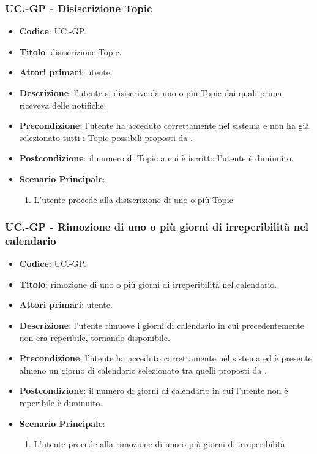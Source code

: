 	\subsubsection{UC\theuccount.\thesubuccount-GP - Disiscrizione Topic}
		
		\begin{itemize}
			\item \textbf{Codice}: UC\theuccount.\thesubuccount-GP.
			\item \textbf{Titolo}: disiscrizione Topic.
			\item \textbf{Attori primari}: utente.
			\item \textbf{Descrizione}: l’utente si disiscrive da uno o più Topic dai quali prima riceveva delle notifiche.
			\item \textbf{Precondizione}: l’utente ha acceduto correttamente nel sistema e non ha già selezionato tutti i Topic possibili proposti da \progetto.
			\item \textbf{Postcondizione}: il numero di Topic a cui è iscritto l’utente è diminuito.
			\item \textbf{Scenario Principale}:
			\begin{enumerate}
				\item L'utente procede alla disiscrizione di uno o più Topic
			\end{enumerate}
		\end{itemize}
	
	\subsubsection{UC\theuccount.\thesubuccount-GP - Rimozione di uno o più giorni di irreperibilità nel calendario}
	
	\begin{itemize}
		\item \textbf{Codice}: UC\theuccount.\thesubuccount-GP.
		\item \textbf{Titolo}: rimozione di uno o più giorni di irreperibilità nel calendario.
		\item \textbf{Attori primari}: utente.
		\item \textbf{Descrizione}: l’utente rimuove i giorni di calendario in cui precedentemente	non era reperibile, tornando disponibile.
		\item \textbf{Precondizione}: l’utente ha acceduto correttamente nel sistema ed è presente almeno un giorno di calendario selezionato tra quelli proposti da \progetto.
		\item \textbf{Postcondizione}: il numero di giorni di calendario in cui l’utente non è reperibile è diminuito.
		\item \textbf{Scenario Principale}:
		\begin{enumerate}
			\item L'utente procede alla rimozione di uno o più giorni di irreperibilità
		\end{enumerate}
	\end{itemize}
	
